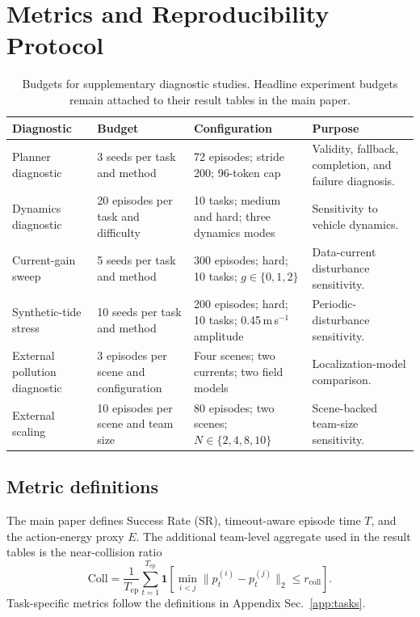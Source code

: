 \section{Metrics and Reproducibility Protocol}
\label{app:protocol}

\begin{table}[t]
\centering
\scriptsize
\setlength{\tabcolsep}{4pt}
\renewcommand{\arraystretch}{1.08}
\begin{tabularx}{\textwidth}{l l l X}
\toprule
\textbf{Diagnostic} & \textbf{Budget} & \textbf{Configuration} & \textbf{Purpose} \\
\midrule
Planner diagnostic & 3 seeds per task and method & 72 episodes; stride 200; 96-token cap & Validity, fallback, completion, and failure diagnosis. \\
Dynamics diagnostic & 20 episodes per task and difficulty & 10 tasks; medium and hard; three dynamics modes & Sensitivity to vehicle dynamics. \\
Current-gain sweep & 5 seeds per task and method & 300 episodes; hard; 10 tasks; $g\in\{0,1,2\}$ & Data-current disturbance sensitivity. \\
Synthetic-tide stress & 10 seeds per task and method & 200 episodes; hard; 10 tasks; 0.45\,m\,s$^{-1}$ amplitude & Periodic-disturbance sensitivity. \\
External pollution diagnostic & 3 episodes per scene and configuration & Four scenes; two currents; two field models & Localization-model comparison. \\
External scaling & 10 episodes per scene and team size & 80 episodes; two scenes; $N\in\{2,4,8,10\}$ & Scene-backed team-size sensitivity. \\
\bottomrule
\end{tabularx}
\caption{Budgets for supplementary diagnostic studies. Headline experiment budgets remain attached to their result tables in the main paper.}
\label{tab:app_protocol_budgets}
\end{table}

\subsection{Metric definitions}

The main paper defines Success Rate (SR), timeout-aware episode time $T$, and the action-energy proxy $E$. The additional team-level aggregate used in the result tables is the near-collision ratio
\begin{equation}
\mathrm{Coll}=\frac{1}{T_{\mathrm{ep}}}\sum_{t=1}^{T_{\mathrm{ep}}}\mathbf 1\!\left[\min_{i<j}\|p_t^{(i)}-p_t^{(j)}\|_2\le r_{\mathrm{coll}}\right].
\end{equation}
Task-specific metrics follow the definitions in Appendix Sec.~\ref{app:tasks}.

